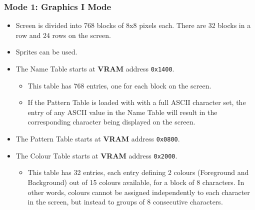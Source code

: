 \documentclass[a4paper,11pt]{article}
\begin{document}
        \subsubsection{Mode 1: \textbf{Graphics I Mode}}
        \begin{itemize}
            \item Screen is divided into 768 blocks of 8x8 pixels each. There
                are 32 blocks in a row and 24 rows on the screen.
            \item Sprites can be used.
            \item The Name Table starts at \textbf{VRAM} address \texttt{0x1400}.
            \begin{itemize}
                \item This table has 768 entries, one for each block on the screen.
                \item If the Pattern Table is loaded with with a full ASCII
                    character set, the entry of any ASCII value in the Name
                    Table will result in the corresponding character being
                    displayed on the screen.
            \end{itemize}
            \item The Pattern Table starts at \textbf{VRAM} address \texttt{0x0800}.
            \item The Colour Table starts at \textbf{VRAM} address \texttt{0x2000}.
            \begin{itemize}
                \item This table has 32 entries, each entry defining 2 colours
                (Foreground and Background) out of 15 colours available, for a
                block of 8 characters. In other words, colours cannot be
                assigned independently to each character in the screen, but
                instead to groups of 8 consecutive characters.
            \end{itemize}
        \end{itemize}

\end{document}
